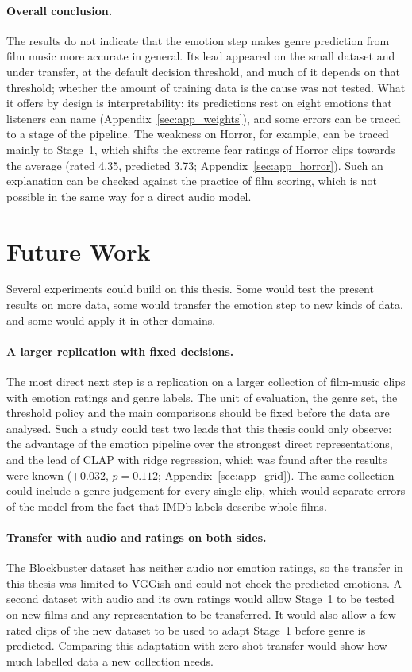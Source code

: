 \paragraph{Overall conclusion.} The results do not indicate that the emotion step makes
genre prediction from film music more accurate in general. Its lead appeared on the small dataset and under transfer, at the default decision threshold, and much of it depends on that threshold; whether the amount of training data is the cause was not tested. What it offers by design is interpretability: its predictions rest on eight emotions that listeners can name (Appendix~\ref{sec:app_weights}), and some errors can be traced to a stage of the pipeline. The weakness on Horror, for
example, can be traced mainly to Stage~1, which shifts the extreme fear ratings of Horror clips towards the
average (rated 4.35, predicted 3.73; Appendix~\ref{sec:app_horror}). Such an explanation can
be checked against the practice of film scoring, which is not possible in the same way for a
direct audio model.

\section{Future Work}
\label{sec:futurework}

Several experiments could build on this thesis. Some would test the present results on more
data, some would transfer the emotion step to new kinds of data, and some would apply it in
other domains.

\paragraph{A larger replication with fixed decisions.} The most direct next step is a
replication on a larger collection of film-music clips with emotion ratings and genre
labels. The unit of evaluation, the genre set, the threshold policy and the main comparisons
should be fixed before the data are analysed. Such a study could test two leads that this
thesis could only observe: the advantage of the emotion pipeline over the strongest direct
representations, and the lead of CLAP with ridge regression, which was found after the
results were known ($+0.032$, $p=0.112$; Appendix~\ref{sec:app_grid}). The same collection
could include a genre judgement for every single clip, which would separate errors of the
model from the fact that IMDb labels describe whole films.

\paragraph{Transfer with audio and ratings on both sides.} The Blockbuster dataset has
neither audio nor emotion ratings, so the transfer in this thesis was limited to VGGish and
could not check the predicted emotions. A second dataset with audio and its own ratings would
allow Stage~1 to be tested on new films and any representation to be transferred. It would
also allow a few rated clips of the new dataset to be used to adapt Stage~1 before genre is
predicted. Comparing this adaptation with zero-shot transfer would show how much labelled
data a new collection needs.

